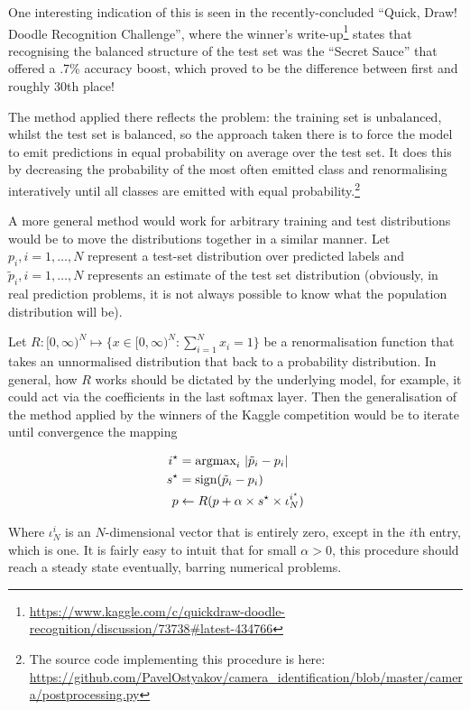 \documentclass[10pt,twocolumn,letterpaper]{article}
\begin{document}
One interesting indication of this is seen in the recently-concluded ``Quick, Draw! Doodle Recognition Challenge'', where the winner's write-up\footnote{\url{https://www.kaggle.com/c/quickdraw-doodle-recognition/discussion/73738\#latest-434766}} states that recognising the balanced structure of the test set was the ``Secret Sauce'' that offered a .7\% accuracy boost, which proved to be the difference between first and roughly 30th place!

The method applied there reflects the problem: the training set is unbalanced, whilst the test set is balanced, so the approach taken there is to force the model to emit predictions in equal probability on average over the test set. It does this by decreasing the probability of the most often emitted class and renormalising interatively until all classes are emitted with equal probability.\footnote{The source code implementing this procedure is here: \url{https://github.com/PavelOstyakov/camera_identification/blob/master/camera/postprocessing.py}}

A more general method would work for arbitrary training and test distributions would be to move the distributions together in a similar manner. Let $p_i, i = 1, \hdots, N$ represent a test-set distribution over predicted labels and $\tilde{p}_i, i = 1, \hdots, N$ represents an estimate of the test set distribution (obviously, in real prediction problems, it is not always possible to know what the population distribution will be).

Let $R: [0, \infty)^N \mapsto \{x \in [0, \infty)^N : \sum_{i=1}^N x_i = 1 \}$ be a renormalisation function that takes an unnormalised distribution that back to a probability distribution. In general, how $R$ works should be dictated by the underlying model, for example, it could act via the coefficients in the last softmax layer. Then the generalisation of the method applied by the winners of the Kaggle competition would be to iterate until convergence the mapping

\begin{align*}
i^\star &= \textnormal{argmax}_i\ |\tilde{p}_i - p_i| \\
s^\star &= \textnormal{sign}(\tilde{p}_i - p_i) \\
p &\leftarrow R(p + \alpha \times s^\star \times \iota_N^{i^\star})
\end{align*}

Where $\iota^i_N$ is an $N$-dimensional vector that is entirely zero, except in the $i$th entry, which is one. It is fairly easy to intuit that for small $\alpha > 0$, this procedure should reach a steady state eventually, barring numerical problems. 
\end{document}
